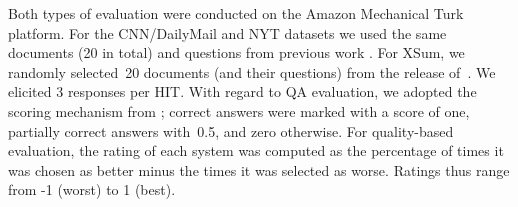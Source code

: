 \documentclass[11pt,a4paper]{article}
\makeatletter
\newcommand{\thickhline}{\noalign {\ifnum 0=`}\fi \hrule height 1pt
    \futurelet \reserved@a \@xhline
}
\makeatother
\begin{document}
    
    
    
    
    \begin{table}[t]
        \caption{QA-based evaluation. Models with~${\dagger}$  are
            significantly different  from \textsc{BertSum} (using a paired
            student t-test; \mbox{$p < 0.05$}). Table cells are filled
            with --- whenever system output is not available.}
        \label{human-ext}
    \end{table}
    
    
    Both types of evaluation were conducted on the Amazon Mechanical
    Turk platform. For the CNN/DailyMail and NYT datasets we used the
    same documents (20 in total) and questions from previous work
    \cite{narayan2018ranking,yang19sumo}. For XSum, we randomly
    selected~20 documents (and their questions) from the release
    of~\citet{xsum}. We elicited 3 responses per HIT.  With regard to
    QA evaluation, we adopted the scoring mechanism from
    \citet{clarke2010discourse}; correct answers were marked with a
    score of one, partially correct answers with~0.5, and zero
    otherwise. For quality-based evaluation, the rating of each system
    was computed as the percentage of times it was chosen as better
    minus the times it was selected as worse. Ratings thus range from
    -1 (worst) to 1 (best).
    
\end{document}
